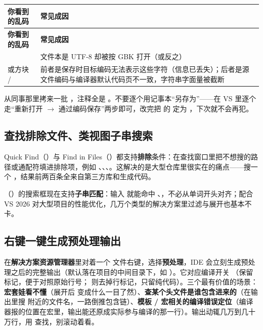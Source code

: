 \begin{longtable}{L{5.0cm}L{9.6cm}}\toprule
\textbf{你看到的乱码} & \textbf{常见成因} \\ \midrule \endfirsthead
\toprule \textbf{你看到的乱码} & \textbf{常见成因} \\ \midrule \endhead \bottomrule \endlastfoot
{} & 文件本是 UTF-8 却被按 GBK 打开（或反之） \\
 或方块 /  & 前者是保存时目标编码无法表示这些字符（信息已丢失）；后者是源文件编码与编译器默认代码页不一致，字符串字面量被截断 \\
\end{longtable}
\begin{keybox}[实战场景]
从同事那里拷来一批 ，注释全是 。不要逐个用记事本“另存为”——在 VS 里逐个走“重新打开 $\rightarrow$ 通过编码保存”两步即可，改完把  的  定为 ，下次就不会再犯。
\end{keybox}

\subsection{查找排除文件、类视图子串搜索}

Quick Find（）与 Find in Files（）都支持\textbf{排除}条件：在查找窗口里把不想搜的路径或通配符填进排除项，例如 、、、。这解决的是大型仓库里很实在的痛点——搜一个 ，结果前两百条全来自第三方库和生成代码。

（）的搜索框现在支持\textbf{子串匹配}：输入  就能命中 、，不必从单词开头对齐；配合 VS 2026 对大型项目的性能优化，几万个类型的解决方案里过滤与展开也基本不卡。

\subsection{右键一键生成预处理输出}

在\textbf{解决方案资源管理器}里对着一个  文件右键，选择\textbf{预处理}，IDE 会立刻生成预处理之后的完整输出（默认落在项目的中间目录下，如 ）。它对应编译开关 （保留  标记，便于对照原始行号； 则去掉行标记，只留纯代码）。三个最有价值的场景：\textbf{宏套娃看不懂}（展开后  变成什么一目了然）、\textbf{查某个头文件是谁包含进来的}（在输出里搜  附近的文件名，一路倒推包含链）、\textbf{模板 / 宏相关的编译错误定位}（编译器报的位置在宏里，输出能还原成实际参与编译的那一行）。输出动辄几万到几十万行，用  查找，别滚动着看。

